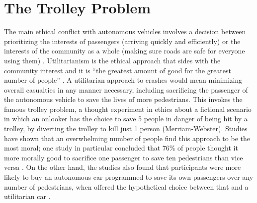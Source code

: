 \documentclass[10pt,twocolumn]{article}
\begin{document}
\section{The Trolley Problem}
The main ethical conflict with autonomous vehicles involves a decision between prioritizing the interests of passengers (arriving quickly and efficiently) or the interests of the community as a whole (making sure roads are safe for everyone using them)  \cite{AutonomousAccidents}. Utilitarianism is the ethical approach that sides with the community interest and it is “the greatest amount of good for the greatest number of people”  \cite{AutonomousAccidents}. A utilitarian approach to crashes would mean minimizing overall casualties in any manner necessary, including sacrificing the passenger of the autonomous vehicle to save the lives of more pedestrians. This invokes the famous trolley problem, a thought experiment in ethics about a fictional scenario in which an onlooker has the choice to save 5 people in danger of being hit by a trolley, by diverting the trolley to kill just 1 person (Merriam-Webster).  Studies have shown that an overwhelming number of people find this approach to be the most moral; one study in particular concluded that 76\% of people thought it more morally good to sacrifice one passenger to save ten pedestrians than vice versa  \cite{AutonomousAccidents}. On the other hand, the studies also found that participants were more likely to buy an autonomous car programmed to save its own passengers over any number of pedestrians, when offered the hypothetical choice between that and a utilitarian car  \cite{AutonomousAccidents}.
\end{document}
